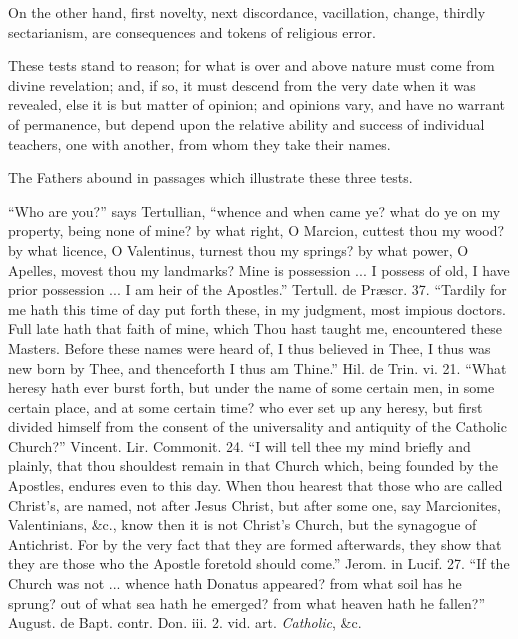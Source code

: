 On the other hand, first novelty, next
discordance, vacillation, change, thirdly sectarianism, are
consequences and tokens of religious error.

These tests stand to reason; for what is over and
above nature must come from divine revelation; and, if so, it must
descend from the very date when it was revealed, else it is but matter
of opinion; and opinions vary, and have no warrant of permanence, but
depend upon the relative ability and success of individual teachers,
one with another, from whom they take their names.

The Fathers abound in passages which illustrate
these three tests.

``Who are you?'' says Tertullian, ``whence and
when came ye? what do ye on my property, being none of mine? by what
right, O Marcion, cuttest thou my wood? by what licence, O Valentinus,
turnest thou my springs? by what power, O Apelles, movest thou my
landmarks? Mine is possession ... I possess of old, I have prior
possession ... I am heir of the Apostles.'' Tertull. de Præscr. 37. ``Tardily for me hath this time of day put forth these, in my
judgment, most impious doctors. Full late hath that faith of mine,
which Thou hast taught me, encountered these Masters. Before these
names were heard of, I thus believed in Thee, I thus was new born by
Thee, and thenceforth I thus am Thine.'' Hil. de Trin. vi. 21. ``What heresy hath ever burst forth, but under the name of some
certain men, in some certain place, and at some certain time? who ever
set up any heresy, but first divided himself from the consent of the
universality and antiquity of the Catholic Church?'' Vincent. Lir.
Commonit. 24. ``I will tell thee my mind briefly and plainly, that
thou shouldest remain in that Church which, being founded by the
Apostles, endures even to this day. When thou hearest that those who
are called Christ's, are named, not after Jesus Christ, but after
some one, say Marcionites, Valentinians, \&c., know then it is not
Christ's Church, but the synagogue of Antichrist. For by the very
fact that they are formed afterwards, they show that they are those
who the Apostle foretold should come.'' Jerom. in Lucif. 27. ``If
the Church was not ... whence hath Donatus appeared? from what soil
has he sprung? out of what sea hath he emerged? from what heaven hath
he fallen?'' August. de Bapt. contr. Don. iii. 2. vid. art. \emph{Catholic},
\&c.

